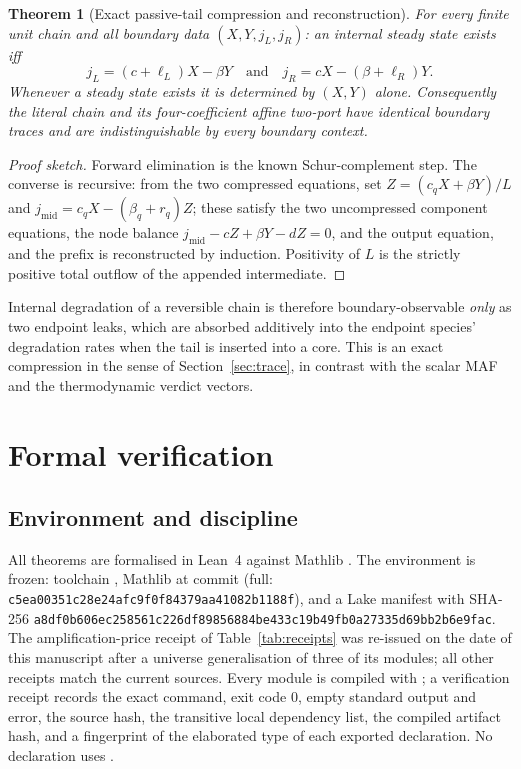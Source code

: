 \documentclass[11pt,a4paper]{article}
\theoremstyle{plain}
\newtheorem{theorem}{Theorem}[section]
\theoremstyle{definition}
\theoremstyle{remark}
\begin{document}
\begin{theorem}[Exact passive-tail compression and reconstruction]\label{thm:tail}
For every finite unit chain and all boundary data $(X,Y,j_L,j_R)$: an internal steady state exists iff
\[
j_L=(c+\ell_L)X-\beta Y\quad\text{and}\quad j_R=cX-(\beta+\ell_R)Y .
\]
Whenever a steady state exists it is determined by $(X,Y)$ alone. Consequently the literal chain and its four-coefficient affine two-port have identical boundary traces and are indistinguishable by every boundary context.
\end{theorem}
\begin{proof}[Proof sketch]
Forward elimination is the known Schur-complement step. The converse is recursive: from the two compressed equations, set $Z=(c_qX+\beta Y)/L$ and $j_{\mathrm{mid}}=c_qX-(\beta_q+r_q)Z$; these satisfy the two uncompressed component equations, the node balance $j_{\mathrm{mid}}-cZ+\beta Y-dZ=0$, and the output equation, and the prefix is reconstructed by induction. Positivity of $L$ is the strictly positive total outflow of the appended intermediate.
\end{proof}

Internal degradation of a reversible chain is therefore boundary-observable \emph{only} as two endpoint leaks, which are absorbed additively into the endpoint species' degradation rates when the tail is inserted into a core. This is an exact compression in the sense of Section~\ref{sec:trace}, in contrast with the scalar MAF and the thermodynamic verdict vectors.

\section{Formal verification}\label{sec:verification}

\subsection{Environment and discipline}

All theorems are formalised in Lean~4 \cite{demoura2021} against Mathlib \cite{mathlib2020}. The environment is frozen: toolchain , Mathlib at commit  (full: \texttt{c5ea00351c28e24a\allowbreak fc9f0f84379aa41082b1188f}), and a Lake manifest with SHA-256 \texttt{a8df0b606ec25856\allowbreak 1c226df89856884be433c19b\allowbreak 49fb0a27335d69bb2b6e9fac}. The amplification-price receipt of Table~\ref{tab:receipts} was re-issued on the date of this manuscript after a universe generalisation of three of its modules; all other receipts match the current sources. Every module is compiled with ; a verification receipt records the exact command, exit code $0$, empty standard output and error, the source hash, the transitive local dependency list, the compiled artifact hash, and a fingerprint of the elaborated type of each exported declaration. No declaration uses .
\end{document}
